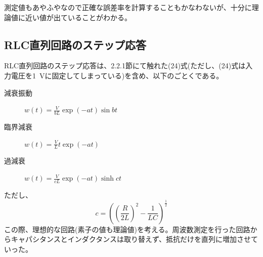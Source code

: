 \documentclass[10pt,a4j,dvipdfmx]{jsarticle}
\begin{document}
測定値もあやふやなので正確な誤差率を計算することもかなわないが、十分に理論値に近い値が出ていることがわかる。

\subsection{RLC直列回路のステップ応答}
RLC直列回路のステップ応答は、2.2.1節にて触れた(24)式(ただし、(24)式は入力電圧を\SI{1}{V}に固定してしまっている)を含め、以下のごとくである。
\begin{description}
 \item[減衰振動] $w(t) = \frac{V}{bL} \exp(-at)\sin bt$
 \item[臨界減衰] $w(t) = \frac{V}{L} t\exp(-at)$
 \item[過減衰] $w(t) = \frac{V}{cL} \exp(-at)\sinh ct$
\end{description}
ただし、
\begin{equation}
c=\left(\left(\frac{R}{2L}\right)^2-\frac{1}{LC}\right)^{\frac{1}{2}}
\end{equation}
この際、理想的な回路(素子の値も理論値)を考える。周波数測定を行った回路からキャパシタンスとインダクタンスは取り替えず、抵抗だけを直列に増加させていった。
\end{document}
